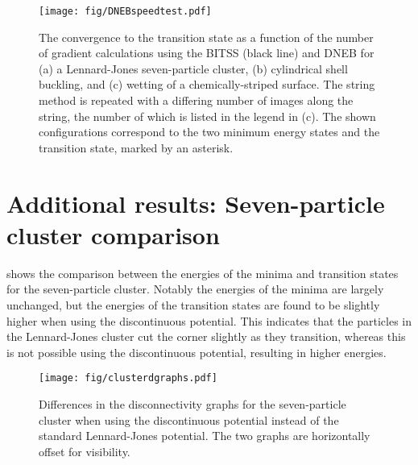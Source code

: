 \documentclass[aps,physrev,10pt]{revtex4-2}
\begin{document}
\begin{figure}[htb]
  \texttt{[image: fig/DNEBspeedtest.pdf]}
  \caption{\label{fig:DNEBspeedtest}
    The convergence to the transition state as a function of the number of gradient calculations using the BITSS (black line) and DNEB for (a) a Lennard-Jones seven-particle cluster, (b) cylindrical shell buckling, and (c) wetting of a chemically-striped surface.
    The string method is repeated with a differing number of images along the string, the number of which is listed in the legend in (c).
    The shown configurations correspond to the two minimum energy states and the transition state, marked by an asterisk.
  }
\end{figure}


\newpage
\section{Additional results: Seven-particle cluster comparison}
 shows the comparison between the energies of the minima and transition states for the seven-particle cluster.
Notably the energies of the minima are largely unchanged, but the energies of the transition states are found to be slightly higher when using the discontinuous potential.
This indicates that the particles in the Lennard-Jones cluster cut the corner slightly as they transition, whereas this is not possible using the discontinuous potential, resulting in higher energies.

\begin{figure}[htb]
  \texttt{[image: fig/clusterdgraphs.pdf]}
  \caption{\label{fig:clusterdgraphs}
    Differences in the disconnectivity graphs for the seven-particle cluster when using the discontinuous potential instead of the standard Lennard-Jones potential.
    The two graphs are horizontally offset for visibility.
  }
\end{figure}
\end{document}
